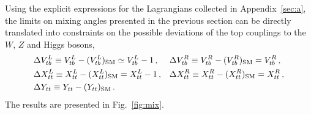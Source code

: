 \documentclass[12pt,a4paper]{article}
\begin{document}
Using the explicit expressions for the Lagrangians collected in Appendix~\ref{sec:a}, 
the limits on mixing angles presented in the previous section can be directly translated into constraints on the possible deviations of the top couplings to the $W$, $Z$ and Higgs bosons,
\begin{align}
& \Delta V_{tb}^L \equiv V_{tb}^L - (V_{tb}^L)_\text{SM} \simeq V_{tb}^L -1 \,,
&& \Delta V_{tb}^R \equiv V_{tb}^R - (V_{tb}^R)_\text{SM} = V_{tb}^R \,, \notag \\
& \Delta X_{tt}^L \equiv X_{tt}^L - (X_{tt}^L)_\text{SM} = X_{tt}^L -1 \,,
&& \Delta X_{tt}^R \equiv X_{tt}^R - (X_{tt}^R)_\text{SM} = X_{tt}^R \,, \notag \\
& \Delta Y_{tt} \equiv Y_{tt} - (Y_{tt})_\text{SM} \,.
\end{align}
The results are presented in Fig.~\ref{fig:mix}.
%
\end{document}
